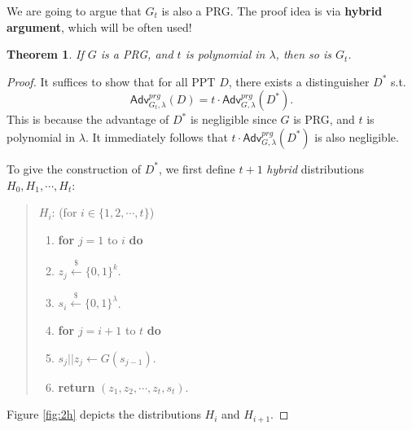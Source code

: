 \documentclass[12pt]{article}
\newcommand{\bits}{\{0,1\}}
\newcommand{\getsr}{\stackrel{\$}{\gets}}
\newcommand{\Adv}{\mathsf{Adv}}
\newcommand{\tab}{\hspace{0.3in}}
\newtheorem{theorem}{Theorem}[section]
\theoremstyle{definition}
\begin{document}
We are going to argue that $G_t$ is also a PRG. The proof idea is via {\bf hybrid argument}, which will be often used!

\begin{theorem}
If $G$ is a PRG, and $t$ is polynomial in $\lambda$, then so is $G_t$.
\end{theorem}
\begin{proof}
It suffices to show that for all PPT $D$, there exists a distinguisher $D^*$ s.t.
$$\Adv_{G_t,\lambda}^{prg}(D) = t\cdot \Adv_{G,\lambda}^{prg}(D^*).$$
This is because the advantage of $D^*$ is negligible since $G$ is PRG, and $t$ is polynomial in $\lambda$. It immediately follows that $t\cdot \Adv_{G,\lambda}^{prg}(D^*)$ is also negligible.

To give the construction of $D^*$, we first define $t+1$ \emph{hybrid} distributions $H_0, H_1, \cdots, H_t$:
\begin{quote}
$H_i$: (for $i \in \{1, 2, \cdots, t\}$)
\begin{enumerate}
\item {\bf for} $j=1$ to $i$ {\bf do}
\item \tab $z_j \getsr \bits^k$.
\item $s_i \getsr \bits^\lambda$.
\item {\bf for} $j=i+1$ to $t$ {\bf do}
\item \tab $s_j||z_j \gets G(s_{j-1})$.
\item {\bf return} $(z_1, z_2, \cdots, z_t, s_t)$.
\end{enumerate}
\end{quote}
Figure \ref{fig:2h} depicts the distributions $H_i$ and $H_{i+1}$.


\end{proof}
\end{document}
